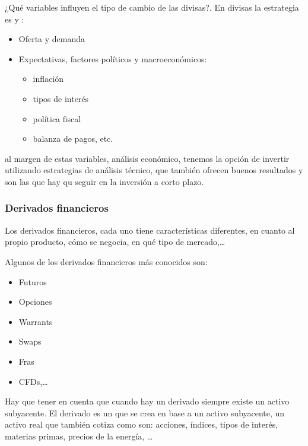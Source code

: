 ¿Qué variables influyen el tipo de cambio de las divisas?. En divisas la estrategia es  y :
\begin{itemize}
    \item Oferta y demanda
    \item Expectativas, factores políticos y macroeconómicos:
    \begin{itemize}
        \item inflación
        \item tipos de interés
        \item política fiscal
        \item balanza de pagos, etc.
    \end{itemize}
\end{itemize}
al margen de estas variables, análisis económico, tenemos la opción de invertir utilizando estrategias de análisis técnico, que también ofrecen buenos resultados y son las que hay qu seguir en la inversión a corto plazo.

\subsubsection{Derivados financieros}

Los derivados financieros, cada uno tiene características diferentes, en cuanto al propio producto, cómo se negocia, en qué tipo de mercado,\ldots 

Algunos de los derivados financieros más conocidos son:
\begin{itemize}
    \item Futuros
    \item Opciones
    \item Warrants
    \item Swaps
    \item Fras 
    \item CFDs,\ldots
\end{itemize}

Hay que tener en cuenta que cuando hay un derivado siempre existe un activo subyacente. El derivado es un  que se crea en base a un activo subyacente, un activo real que también cotiza como son: acciones, índices, tipos de interés, materias primas, precios de la energía, \ldots


